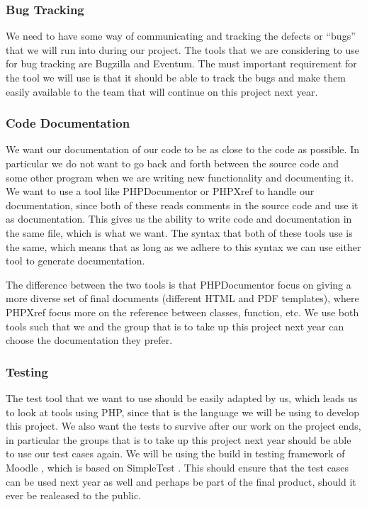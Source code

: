 \subsubsection{Bug Tracking}
We need to have some way of communicating and tracking the defects or ``bugs'' that we will run into during our project.
The tools that we are considering to use for bug tracking are Bugzilla and Eventum.
The must important requirement for the tool we will use is that it should be able to track the bugs and make them easily available to the team that will continue on this project next year.
\cite{bugzillaFeat} \cite{eventumFeat}


\subsubsection{Code Documentation}
We want our documentation of our code to be as close to the code as possible.
In particular we do not want to go back and forth between the source code and some other program when we are writing new functionality and documenting it.
We want to use a tool like PHPDocumentor \cite{phpdocumentor} or PHPXref \cite{phpxref} to handle our documentation, since both of these reads comments in the source code and use it as documentation.
This gives us the ability to write code and documentation in the same file, which is what we want.
The syntax that both of these tools use is the same, which means that as long as we adhere to this syntax we can use either tool to generate documentation.

The difference between the two tools is that PHPDocumentor focus on giving a more diverse set of final documents (different HTML and PDF templates), where PHPXref focus more on the reference between classes, function, etc.
We use both tools such that we and the group that is to take up this project next year can choose the documentation they prefer.


\subsubsection{Testing}
The test tool that we want to use should be easily adapted by us, which leads us to look at tools using PHP, since that is the language we will be using to develop this project.
We also want the tests to survive after our work on the project ends, in particular the groups that is to take up this project next year should be able to use our test cases again.
We will be using the build in testing framework of Moodle \cite{moodletest}, which is based on SimpleTest \cite{simpletest}.
This should ensure that the test cases can be used next year as well and perhaps be part of the final product, should it ever be realeased to the public.










